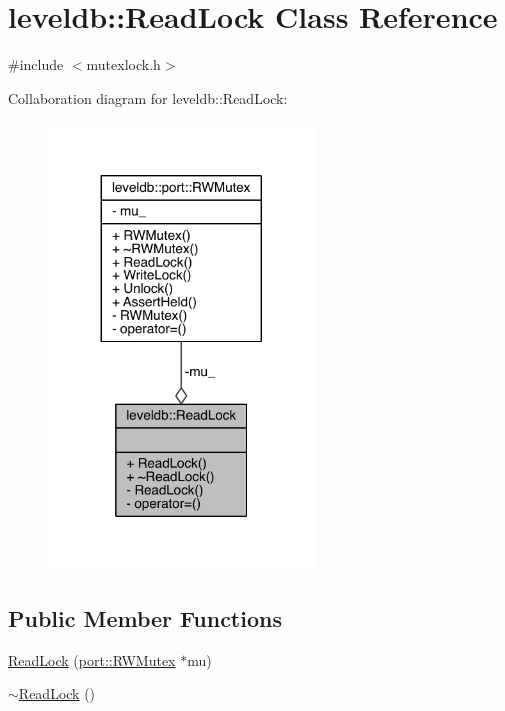 \hypertarget{classleveldb_1_1_read_lock}{}\section{leveldb\+:\+:Read\+Lock Class Reference}
\label{classleveldb_1_1_read_lock}


{\ttfamily \#include $<$mutexlock.\+h$>$}



Collaboration diagram for leveldb\+:\+:Read\+Lock\+:\nopagebreak
\begin{figure}[H]
\begin{center}
\leavevmode
\includegraphics[width=200pt]{classleveldb_1_1_read_lock__coll__graph}
\end{center}
\end{figure}
\subsection*{Public Member Functions}
\begin{DoxyCompactItemize}
\item 
\hyperlink{classleveldb_1_1_read_lock_a89e5b1cd9d2180a37940f081ec81a779}{Read\+Lock} (\hyperlink{classleveldb_1_1port_1_1_r_w_mutex}{port\+::\+R\+W\+Mutex} $\ast$mu)
\item 
\hyperlink{classleveldb_1_1_read_lock_a825590de026b494a0c3a83944a221ccb}{$\sim$\+Read\+Lock} ()
\end{DoxyCompactItemize}
